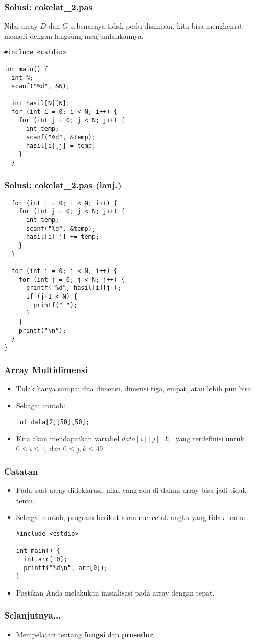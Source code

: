 \begin{frame}[fragile]
\frametitle{Solusi: cokelat\_2.pas}
Nilai array $D$ dan $G$ sebenarnya tidak perlu disimpan, kita bisa menghemat memori dengan langsung menjumlahkannya.
\begin{lstlisting}
#include <cstdio>

int main() {
  int N;
  scanf("%d", &N);

  int hasil[N][N];
  for (int i = 0; i < N; i++) {
    for (int j = 0; j < N; j++) {
      int temp;
      scanf("%d", &temp);
      hasil[i][j] = temp;
    }
  }
\end{lstlisting}
\end{frame}

\begin{frame}[fragile]
\frametitle{Solusi: cokelat\_2.pas (lanj.)}
\begin{lstlisting}
  for (int i = 0; i < N; i++) {
    for (int j = 0; j < N; j++) {
      int temp;
      scanf("%d", &temp);
      hasil[i][j] += temp;
    }
  }

  for (int i = 0; i < N; i++) {
    for (int j = 0; j < N; j++) {
      printf("%d", hasil[i][j]);
      if (j+1 < N) {
        printf(" ");
      }
    }
    printf("\n");
  }
}

\end{lstlisting}
\end{frame}

\begin{frame}[fragile]
\frametitle{Array Multidimensi}
\begin{itemize}
  \item Tidak hanya sampai dua dimensi, dimensi tiga, empat, atau lebih pun bisa.
  \item Sebagai contoh:
\begin{lstlisting}
int data[2][50][50];
\end{lstlisting}
  \item Kita akan mendapatkan variabel $data[i][j][k]$ yang terdefinisi untuk $0 \le i \le 1$, dan $0 \le j, k \le 49$.
\end{itemize}
\end{frame}

\begin{frame}[fragile]
\frametitle{Catatan}
\begin{itemize}
  \item Pada saat array dideklarasi, nilai yang ada di dalam array bisa jadi tidak tentu.
  \item Sebagai contoh, program berikut akan mencetak angka yang tidak tentu:
\begin{lstlisting}
#include <cstdio>

int main() {
  int arr[10];
  printf("%d\n", arr[0]);
}
\end{lstlisting}
  \item Pastikan Anda melakukan inisialisasi pada array dengan tepat.
\end{itemize}
\end{frame}


\begin{frame}
\frametitle{Selanjutnya...}
\begin{itemize}
  \item Mempelajari tentang \textbf{fungsi} dan \textbf{prosedur}.
\end{itemize}
\end{frame}


